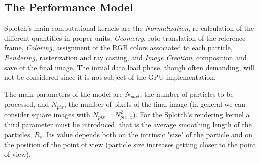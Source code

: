 \documentclass[11pt]{article}
\begin{document}
\subsection{The Performance Model}

Splotch's main computational kernels are the {\it Normalization}, re-calculation
of the different quantities in proper units, {\it Geometry}, roto-translation 
of the reference frame, {\it Coloring}, assignment of the RGB colors associated to each 
particle,  {\it Rendering},
rasterization and ray casting, 
and {\it Image Creation}, composition and save of 
the final image. The initial data load phase, though often demanding, will not be considered
since it is not subject of the GPU implementation.

The main parameters of the model are $N_{part}$, the number of particles
to be processed, and $N_{pix}$, the number of pixels of the final image
(in general we can consider square images with $N_{pix}=N_{pix,x}^2$). For 
the Splotch's rendering kernel a third parameter must be introduced, 
that is the average smoothing length of the particles,
$R_s$. Its value depends both on the intrinsic "size" of the particle
and on the position of the point of view (particle size increases getting closer to 
the point of view).


\end{document}
